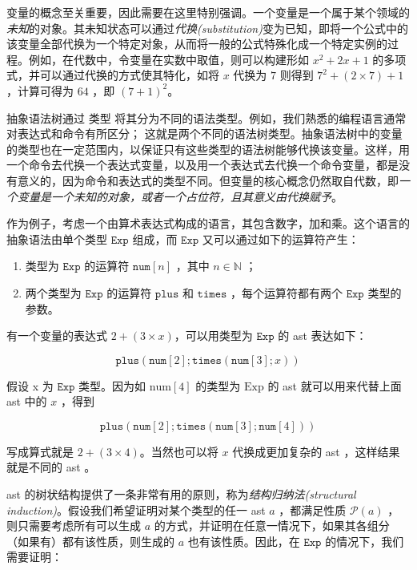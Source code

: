 变量的概念至关重要，因此需要在这里特别强调。一个变量是一个属于某个领域的\emph{未知}的对象。其未知状态可以通过\emph{代换(substitution)}变为已知，即将一个公式中的该变量全部代换为一个特定对象，从而将一般的公式特殊化成一个特定实例的过程。例如，在代数中，令变量在实数中取值，则可以构建形如
\(x^2+2x+1\) 的多项式，并可以通过代换的方式使其特化，如将 \(x\) 代换为
\(7\) 则得到 \(7^2+(2\times 7)+1\) ，计算可得为 \(64\) ，即
\((7+1)^2\)。

抽象语法树通过 \(类型\)
将其分为不同的语法类型。例如，我们熟悉的编程语言通常对表达式和命令有所区分；
这就是两个不同的语法树类型。抽象语法树中的变量的类型也在一定范围内，以保证只有这些类型的语法树能够代换该变量。这样，用一个命令去代换一个表达式变量，以及用一个表达式去代换一个命令变量，都是没有意义的，因为命令和表达式的类型不同。但变量的核心概念仍然取自代数，即\emph{一个变量是一个未知的对象，或者一个占位符，且其意义由代换赋予}。

作为例子，考虑一个由算术表达式构成的语言，其包含数字，加和乘。这个语言的抽象语法由单个类型
\(\texttt{Exp}\) 组成，而 \(\texttt{Exp}\) 又可以通过如下的运算符产生：

\begin{enumerate}
\def\labelenumi{\arabic{enumi}.}
\item
  类型为 \(\texttt{Exp}\) 的运算符 \(\texttt{num}[n]\) ，其中
  \(n \in \mathbb{N}\) ；
\item
  两个类型为 \(\texttt{Exp}\) 的运算符 \(\texttt{plus}\) 和
  \(\texttt{times}\) ，每个运算符都有两个 \(\texttt{Exp}\) 类型的参数。
\end{enumerate}

有一个变量的表达式 \(2+(3\times x)\)，可以用类型为 \(\texttt{Exp}\) 的
ast 表达如下：

\[\texttt{plus}(\texttt{num}[2]; \texttt{times}(\texttt{num}[3];x))\]

假设 x 为 \(\texttt{Exp}\) 类型。因为如 \(\text{num}[4]\) 的类型为
\(\text{Exp}\) 的 ast 就可以用来代替上面 ast 中的 \(x\) ，得到

\[\texttt{plus}(\texttt{num}[2]; \texttt{times}(\texttt{num}[3];\texttt{num}[4]))\]

写成算式就是 \(2+(3\times 4)\)。当然也可以将 \(x\) 代换成更加复杂的 ast
，这样结果就是不同的 ast 。

ast 的树状结构提供了一条非常有用的原则，称为\emph{结构归纳法(structural
induction)}。假设我们希望证明对某个类型的任一 ast \(a\) ，都满足性质
\(\mathcal{P}(a)\) ，则只需要考虑所有可以生成 \(a\)
的方式，并证明在任意一情况下，如果其各组分（如果有）都有该性质，则生成的
\(a\) 也有该性质。因此，在 \(\texttt{Exp}\) 的情况下，我们需要证明：

